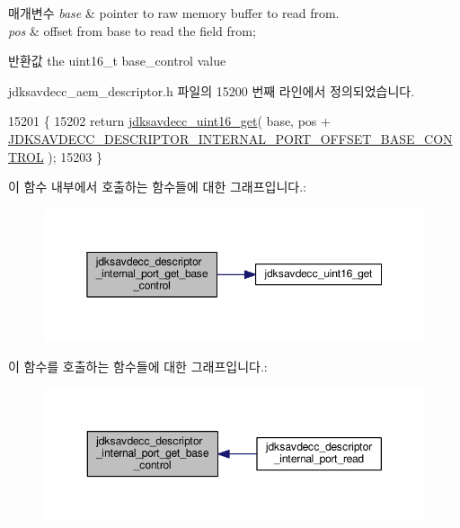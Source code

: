 \begin{DoxyParams}{매개변수}
{\em base} & pointer to raw memory buffer to read from. \\
\hline
{\em pos} & offset from base to read the field from; \\
\hline
\end{DoxyParams}
\begin{DoxyReturn}{반환값}
the uint16\+\_\+t base\+\_\+control value 
\end{DoxyReturn}


jdksavdecc\+\_\+aem\+\_\+descriptor.\+h 파일의 15200 번째 라인에서 정의되었습니다.


\begin{DoxyCode}
15201 \{
15202     \textcolor{keywordflow}{return} \hyperlink{group__endian_ga3fbbbc20be954aa61e039872965b0dc9}{jdksavdecc\_uint16\_get}( base, pos + 
      \hyperlink{group__descriptor__internal__port_ga833e549c8870731a9bf9614b0da8d8de}{JDKSAVDECC\_DESCRIPTOR\_INTERNAL\_PORT\_OFFSET\_BASE\_CONTROL}
       );
15203 \}
\end{DoxyCode}


이 함수 내부에서 호출하는 함수들에 대한 그래프입니다.\+:
\nopagebreak
\begin{figure}[H]
\begin{center}
\leavevmode
\includegraphics[width=350pt]{group__descriptor__internal__port_gafcb5b5c708503347ab874677759ad7ad_cgraph}
\end{center}
\end{figure}




이 함수를 호출하는 함수들에 대한 그래프입니다.\+:
\nopagebreak
\begin{figure}[H]
\begin{center}
\leavevmode
\includegraphics[width=350pt]{group__descriptor__internal__port_gafcb5b5c708503347ab874677759ad7ad_icgraph}
\end{center}
\end{figure}


